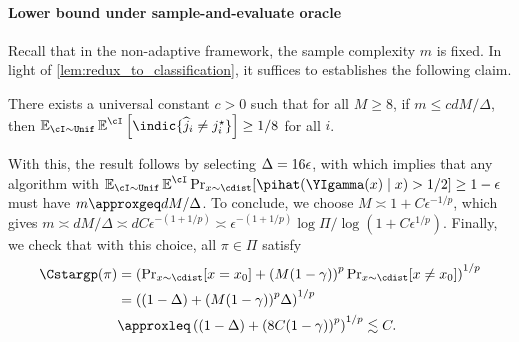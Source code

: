 \paragraph{Lower bound under sample-and-evaluate oracle} 
Recall that in the non-adaptive framework, the sample complexity $m$
is fixed. In light of \cref{lem:redux_to_classification}, it suffices to establishes the following claim.
\begin{lemma}
  \label{lem:nonadaptive_lower}
  There exists a universal constant $c>0$ such that for all $M \ge 8$, if $m \le cdM/\Delta$, then 
    $ \EnI\Enki\left[ \indic\{\wh{j}_i \ne j_i^\star\}\right] \ge 1/8$
    for all $i$.
\end{lemma}
With this, the result follows by selecting $\Delta = 16\epsilon$, with
which  implies that any algorithm
with $\EnI\Enki\Pr_{x \sim
  \cdist}[\pihat(\YIgamma(x)\mid{}x) > 1/2] \geq{} 1 - \epsilon$ must
have $m \approxgeq dM/\Delta$. To
conclude, we choose $M \asymp 1+ C \epsilon^{-1/p}$, which gives
$m\asymp dM/\Delta \asymp dC\epsilon^{-(1+1/p)} \asymp \epsilon^{-(1+1/p)}
\log \Pi/\log(1+ C \epsilon^{1/p})$. Finally, we check that with this
choice, all $\pi \in \Pi$ satisfy
\begin{align}
  \Cstargp(\pi) 
    &= \left(\Pr_{x \sim \cdist}\brk*{x=x_0} + \prn*{M(1-\gamma)}^p\Pr_{x \sim \cdist}\brk*{x \neq x_0}\right)^{1/p}\\
    &= \left((1-\Delta) + \prn*{M(1-\gamma)}^p \Delta\right)^{1/p} \\
    &\approxleq \left((1-\Delta) + \prn*{8C(1-\gamma)}^p \right)^{1/p} \lesssim C.
\end{align}

